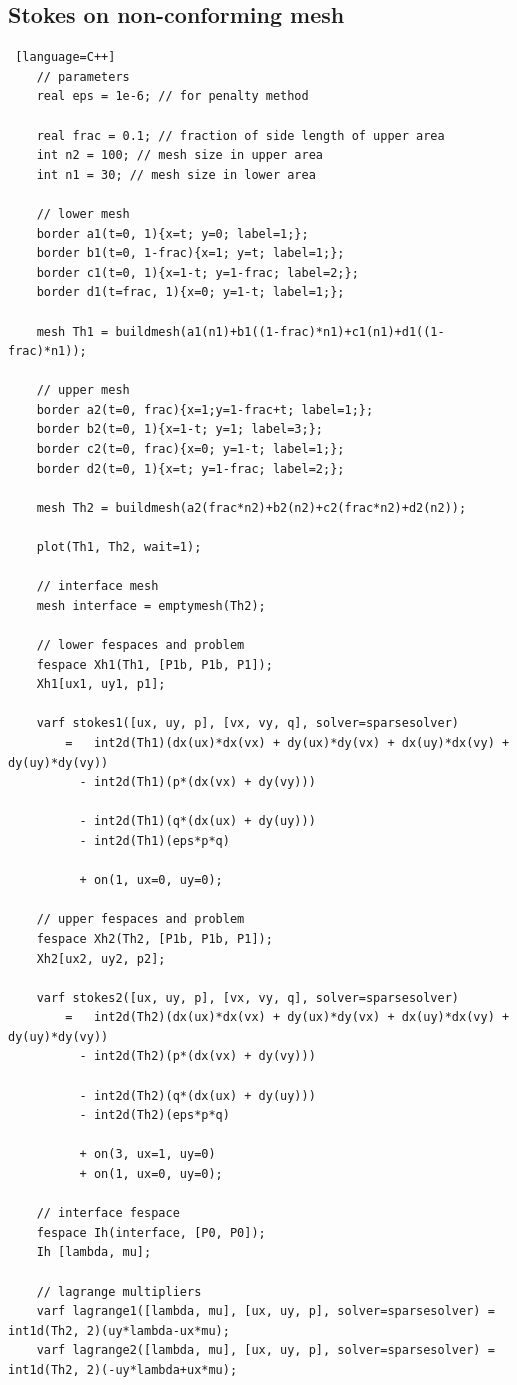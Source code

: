 \documentclass{article}
\begin{document}
\subsection*{Stokes on non-conforming mesh}
\begin{lstlisting} [language=C++]
	// parameters
	real eps = 1e-6; // for penalty method 

	real frac = 0.1; // fraction of side length of upper area
	int n2 = 100; // mesh size in upper area
	int n1 = 30; // mesh size in lower area

	// lower mesh
	border a1(t=0, 1){x=t; y=0; label=1;};
	border b1(t=0, 1-frac){x=1; y=t; label=1;};
	border c1(t=0, 1){x=1-t; y=1-frac; label=2;};
	border d1(t=frac, 1){x=0; y=1-t; label=1;};

	mesh Th1 = buildmesh(a1(n1)+b1((1-frac)*n1)+c1(n1)+d1((1-frac)*n1));

	// upper mesh
	border a2(t=0, frac){x=1;y=1-frac+t; label=1;};
	border b2(t=0, 1){x=1-t; y=1; label=3;};
	border c2(t=0, frac){x=0; y=1-t; label=1;};
	border d2(t=0, 1){x=t; y=1-frac; label=2;};

	mesh Th2 = buildmesh(a2(frac*n2)+b2(n2)+c2(frac*n2)+d2(n2));

	plot(Th1, Th2, wait=1);

	// interface mesh
	mesh interface = emptymesh(Th2);

	// lower fespaces and problem
	fespace Xh1(Th1, [P1b, P1b, P1]);
	Xh1[ux1, uy1, p1];

	varf stokes1([ux, uy, p], [vx, vy, q], solver=sparsesolver)
		=   int2d(Th1)(dx(ux)*dx(vx) + dy(ux)*dy(vx) + dx(uy)*dx(vy) + dy(uy)*dy(vy))
	  	  - int2d(Th1)(p*(dx(vx) + dy(vy)))

	  	  - int2d(Th1)(q*(dx(ux) + dy(uy)))
	  	  - int2d(Th1)(eps*p*q)

	  	  + on(1, ux=0, uy=0);

	// upper fespaces and problem
	fespace Xh2(Th2, [P1b, P1b, P1]);
	Xh2[ux2, uy2, p2];

	varf stokes2([ux, uy, p], [vx, vy, q], solver=sparsesolver)
		=   int2d(Th2)(dx(ux)*dx(vx) + dy(ux)*dy(vx) + dx(uy)*dx(vy) + dy(uy)*dy(vy))
	  	  - int2d(Th2)(p*(dx(vx) + dy(vy)))

	  	  - int2d(Th2)(q*(dx(ux) + dy(uy)))
	  	  - int2d(Th2)(eps*p*q)

	  	  + on(3, ux=1, uy=0)
	  	  + on(1, ux=0, uy=0);

	// interface fespace
	fespace Ih(interface, [P0, P0]);
	Ih [lambda, mu];

	// lagrange multipliers
	varf lagrange1([lambda, mu], [ux, uy, p], solver=sparsesolver) = int1d(Th2, 2)(uy*lambda-ux*mu);
	varf lagrange2([lambda, mu], [ux, uy, p], solver=sparsesolver) = int1d(Th2, 2)(-uy*lambda+ux*mu);


\end{lstlisting}
\end{document}

